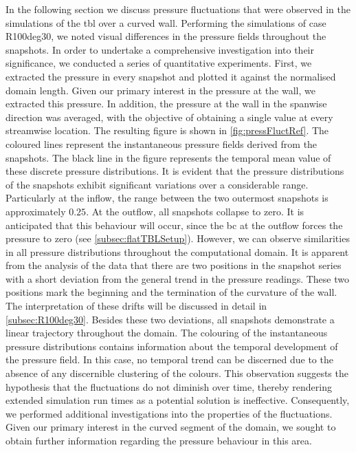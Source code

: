 In the following section we discuss pressure fluctuations that were observed in the simulations of the \acrshort{tbl} over a curved wall.
Performing the simulations of case R100deg30, we noted visual differences in the pressure fields throughout the snapshots. 
In order to undertake a comprehensive investigation into their significance, we conducted a series of quantitative experiments.
First, we extracted the pressure in every snapshot and plotted it against the normalised domain length.
Given our primary interest in the pressure at the wall, we extracted this pressure.
In addition, the pressure at the wall in the spanwise direction was averaged, with the objective of obtaining a single value at every streamwise location.
The resulting figure is shown in \autoref{fig:pressFluctRef}.
The coloured lines represent the instantaneous pressure fields derived from the snapshots.
The black line in the figure represents the temporal mean value of these discrete pressure distributions.
It is evident that the pressure distributions of the snapshots exhibit significant variations over a considerable range.
Particularly at the inflow, the range between the two outermost snapshots is approximately $0.25$.
At the outflow, all snapshots collapse to zero.
It is anticipated that this behaviour will occur, since the \acrshort{bc} at the outflow forces the pressure to zero (see \autoref{subsec:flatTBLSetup}).
However, we can observe similarities in all pressure distributions throughout the computational domain.
It is apparent from the analysis of the data that there are two positions in the snapshot series with a short deviation from the general trend in the pressure readings.
These two positions mark the beginning and the termination of the curvature of the wall.
The interpretation of these drifts will be discussed in detail in \autoref{subsec:R100deg30}.
Besides these two deviations, all snapshots demonstrate a linear trajectory throughout the domain.
The colouring of the instantaneous pressure distributions contains information about the temporal development of the pressure field.
In this case, no temporal trend can be discerned due to the absence of any discernible clustering of the colours.
This observation suggests the hypothesis that the fluctuations do not diminish over time, thereby rendering extended simulation run times as a potential solution is ineffective.
Consequently, we performed additional investigations into the properties of the fluctuations.
Given our primary interest in the curved segment of the domain, we sought to obtain further information regarding the pressure behaviour in this area.


